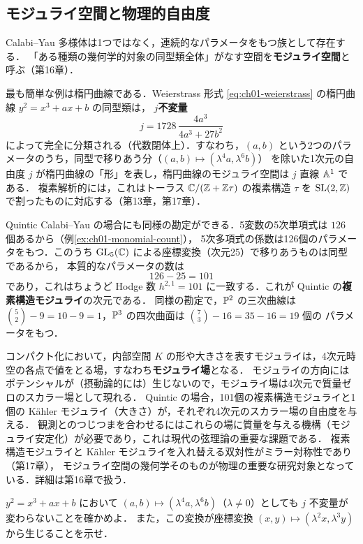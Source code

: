 \subsection{モジュライ空間と物理的自由度}

Calabi--Yau 多様体は1つではなく，連続的なパラメータをもつ族として存在する．
「ある種類の幾何学的対象の同型類全体」がなす空間を\textbf{モジュライ空間}と呼ぶ（第16章）．

最も簡単な例は楕円曲線である．Weierstrass 形式 \eqref{eq:ch01-weierstrass} の楕円曲線 $y^2=x^3+ax+b$ の同型類は，
\textbf{$j$不変量}
\[
  j=1728\,\frac{4a^3}{4a^3+27b^2}
\]
によって完全に分類される（代数閉体上）．すなわち，$(a,b)$ という2つのパラメータのうち，同型で移りあう分（$(a,b)\mapsto(\lambda^4a,\lambda^6b)$）
を除いた1次元の自由度 $j$ が楕円曲線の「形」を表し，楕円曲線のモジュライ空間は $j$ 直線 $\mathbb{A}^1$ である．
複素解析的には，これはトーラス $\mathbb{C}/(\mathbb{Z}+\mathbb{Z}\tau)$ の複素構造 $\tau$ を $\operatorname{SL}(2,\mathbb{Z})$ で割ったものに対応する（第13章，第17章）．

Quintic Calabi--Yau の場合にも同様の勘定ができる．5変数の5次単項式は $126$ 個あるから（例\ref{ex:ch01-monomial-count}），
5次多項式の係数は126個のパラメータをもつ．このうち $\operatorname{GL}_5(\mathbb{C})$ による座標変換（次元25）で移りあうものは同型であるから，
本質的なパラメータの数は
\[
  126-25=101
\]
であり，これはちょうど Hodge 数 $h^{2,1}=101$ に一致する．これが Quintic の\textbf{複素構造モジュライ}の次元である．
同様の勘定で，$\mathbb{P}^2$ の三次曲線は $\binom{5}{2}-9=10-9=1$，$\mathbb{P}^3$ の四次曲面は $\binom{7}{3}-16=35-16=19$ 個の
パラメータをもつ．

\begin{physbox}[モジュライ場]
コンパクト化において，内部空間 $K$ の形や大きさを表すモジュライは，4次元時空の各点で値をとる場，すなわち\textbf{モジュライ場}となる．
モジュライの方向にはポテンシャルが（摂動論的には）生じないので，モジュライ場は4次元で質量ゼロのスカラー場として現れる．
Quintic の場合，101個の複素構造モジュライと1個の Kähler モジュライ（大きさ）が，それぞれ4次元のスカラー場の自由度を与える．
観測とのつじつまを合わせるにはこれらの場に質量を与える機構（モジュライ安定化）が必要であり，これは現代の弦理論の重要な課題である．
複素構造モジュライと Kähler モジュライを入れ替える双対性がミラー対称性であり（第17章），
モジュライ空間の幾何学そのものが物理の重要な研究対象となっている．詳細は第16章で扱う．
\end{physbox}

$y^2=x^3+ax+b$ において $(a,b)\mapsto(\lambda^4a,\lambda^6b)$（$\lambda\ne0$）としても $j$ 不変量が変わらないことを確かめよ．
また，この変換が座標変換 $(x,y)\mapsto(\lambda^2x,\lambda^3y)$ から生じることを示せ．

